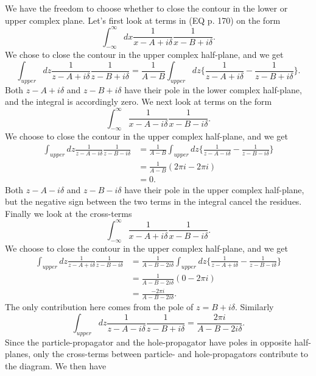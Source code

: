 We have the freedom to choose whether to close the contour in the lower or upper complex plane. Let's first look at terms in (EQ p. 170) on the form
\begin{equation}
\int_{-\infty}^{\infty}dx\frac{1}{x-A+i\delta}\frac{1}{x-B+i\delta}.
\end{equation}
We chose to close the contour in the upper complex half-plane, and we get
\begin{equation}
\int_{upper}dz\frac{1}{z-A+i\delta}\frac{1}{z-B+i\delta}=\frac{1}{A-B}\int_{upper}dz\{\frac{1}{z-A+i\delta}-\frac{1}{z-B+i\delta}\}.
\end{equation}
Both $z-A+i\delta$ and $z-B+i\delta$ have their pole in the lower complex half-plane, and the integral is accordingly zero.
We next look at terms on the form
\begin{equation}
\int_{-\infty}^{\infty}\frac{1}{x-A-i\delta}\frac{1}{x-B-i\delta}.
\end{equation}
We choose to close the contour in the upper complex half-plane, and we get
\begin{align}
\int_{upper}dz\frac{1}{z-A-i\delta}\frac{1}{z-B-i\delta}&=\frac{1}{A-B}\int_{upper}dz\{\frac{1}{z-A-i\delta}-\frac{1}{z-B-i\delta}\}\\
&=\frac{1}{A-B}(2\pi i-2\pi i)\\
&=0.
\end{align}
Both $z-A-i\delta$ and $z-B-i\delta$ have their pole in the upper complex half-plane, but the negative sign between the two terms in the integral cancel the residues. Finally we look at the cross-terms
\begin{equation}
\int_{-\infty}^{\infty}\frac{1}{x-A+i\delta}\frac{1}{x-B-i\delta}.
\end{equation}
We choose to close the contour in the upper complex half-plane, and we get
\begin{align}
\int_{upper}dz\frac{1}{z-A+i\delta}\frac{1}{z-B-i\delta}&=\frac{1}{A-B-2i\delta}\int_{upper}dz\{\frac{1}{z-A+i\delta}-\frac{1}{z-B-i\delta}\}\\
&=\frac{1}{A-B-2i\delta}(0-2\pi i)\\
&=\frac{-2\pi i}{A-B-2i\delta}.
\end{align}
The only contribution here comes from the pole of $z=B+i\delta$. Similarly
\begin{equation}
\int_{upper}dz\frac{1}{z-A-i\delta}\frac{1}{z-B+i\delta}=\frac{2\pi i}{A-B-2i\delta}.
\end{equation}
Since the particle-propagator and the hole-propagator have poles in opposite half-planes, only the cross-terms between particle- and hole-propagators contribute to the diagram. We then have
